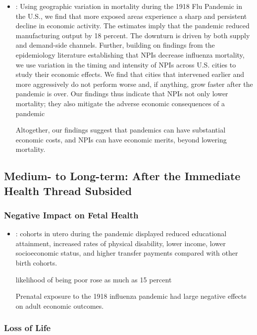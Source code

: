 \documentclass[12pt,a4paper]{article}
\begin{document}
\begin{itemize}
	\item \cite{correiaPandemicsDepressEconomy2020}:
	Using geographic variation in mortality during the 1918 Flu Pandemic in
	the U.S., we find that more exposed areas experience a sharp and persistent decline
	in economic activity. The estimates imply that the pandemic reduced manufacturing
	output by 18 percent. The downturn is driven by both supply and demand-side channels.
	Further, building on findings from the epidemiology literature establishing that NPIs
	decrease influenza mortality, we use variation in the timing and intensity of NPIs
	across U.S. cities to study their economic effects. We find that cities that intervened
	earlier and more aggressively do not perform worse and, if anything, grow faster after
	the pandemic is over. Our findings thus indicate that NPIs not only lower mortality;
	they also mitigate the adverse economic consequences of a pandemic
	
	Altogether, our	findings suggest that pandemics can have substantial economic costs, and NPIs can have
	economic merits, beyond lowering mortality.
\end{itemize}

\subsection{Medium- to Long-term: After the Immediate Health Thread Subsided}

\subsubsection{Negative Impact on Fetal Health}
\begin{itemize}
	\item \cite{almond1918InfluenzaPandemic2006}: cohorts in utero during
	the pandemic displayed reduced educational attainment, increased
	rates of physical disability, lower income, lower socioeconomic status,
	and higher transfer payments compared with other birth cohorts.
	
	likelihood of being poor rose as much as 15 percent
	
	Prenatal exposure to the 1918 influenza pandemic had large negative
	effects on adult economic outcomes. 
\end{itemize}

\subsubsection{Loss of Life}
\end{document}

